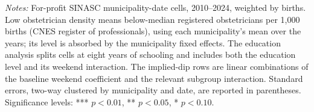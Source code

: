 \begin{table}[H]
{\begin{tabular}{lcc}
\bottomrule
   \end{tabular}
}
\begin{minipage}{\linewidth}\footnotesize
\textit{Notes:} For-profit SINASC municipality-date cells, 2010--2024, weighted by births. Low obstetrician density means below-median registered obstetricians per 1,000 births (CNES register of professionals), using each municipality's mean over the years; its level is absorbed by the municipality fixed effects. The education analysis splits cells at eight years of schooling and includes both the education level and its weekend interaction. The implied-dip rows are linear combinations of the baseline weekend coefficient and the relevant subgroup interaction. Standard errors, two-way clustered by municipality and date, are reported in parentheses.
\newline
\footnotesize Significance levels: *** $p<0.01$, ** $p<0.05$, * $p<0.10$.
\end{minipage}
\end{table}


